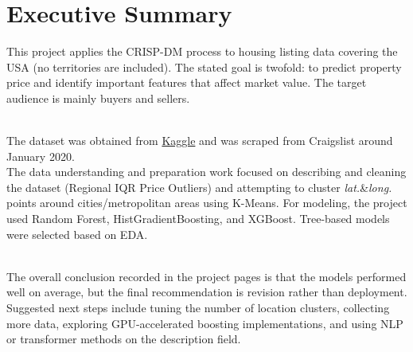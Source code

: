 \section*{Executive Summary}
\noindent
This project applies the CRISP-DM process to housing listing data covering the USA (no territories are included). The stated goal is twofold: to predict property price and %
identify important features that affect market value. %
The target audience is mainly buyers and sellers.

\\
\noindent
The dataset was obtained from \href{https://www.kaggle.com/datasets/austinreese/usa-housing-listings}{Kaggle} and was scraped from Craigslist around January 2020.\\
\noindent
The data understanding and preparation work focused on %
describing and cleaning the dataset (Regional IQR Price Outliers)
and attempting to cluster \textit{lat.}\&\textit{long.} points around cities/metropolitan areas using K-Means. %
For modeling, the project used Random Forest, HistGradientBoosting, and XGBoost. Tree-based models were selected based on EDA.


\\
\noindent
The overall conclusion recorded in the project pages is that the models performed well on average, but the final recommendation is revision rather than deployment. Suggested next steps include tuning the number of location clusters, collecting more data, exploring GPU-accelerated boosting implementations, and using NLP or transformer methods on the description field. %


